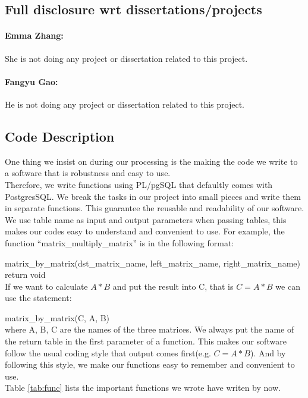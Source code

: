 \subsection{Full disclosure wrt dissertations/projects}

\paragraph{Emma Zhang:}
She is not doing any project or dissertation related to this project.
\paragraph{Fangyu Gao:} 
He is not doing any project or dissertation related to this project.

\subsection{Code Description}
One thing we insist on during our processing is the making the code we write to a software that is robustness and easy to use. \\
Therefore, we write functions using PL/pgSQL that defaultly comes with PostgresSQL. We break the tasks in our project into small pieces and write them in separate functions. This guarantee the reusable and readability of our software.\\
We use table name as input and output parameters when passing tables, this makes our codes easy to understand and convenient to use.
For example, the function “matrix\_multiply\_matrix” is in the following format:

matrix\_by\_matrix(dst\_matrix\_name, left\_matrix\_name, right\_matrix\_name) return void \\
If we want to calculate $A * B$ and put the result into C, that is $C = A * B$ we can use the statement:


matrix\_by\_matrix(C, A, B)\\
where A, B, C are the names of the three matrices. We always put the name of the return table in the first parameter of a function. This makes our software follow the usual coding style that output comes first(e.g. $C = A * B$). And by following this style, we make our functions easy to remember and convenient to use.\\
Table \ref{tab:func} lists the important functions we wrote have writen by now.

